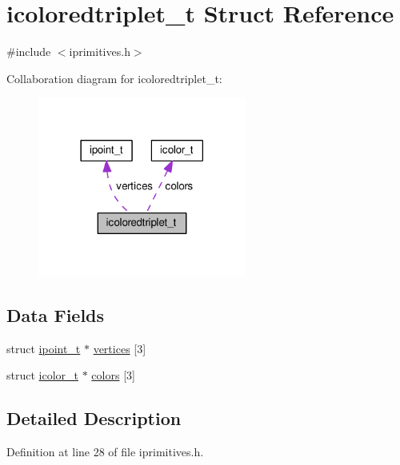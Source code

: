 \hypertarget{structicoloredtriplet__t}{\section{icoloredtriplet\-\_\-t Struct Reference}
\label{structicoloredtriplet__t}
}


{\ttfamily \#include $<$iprimitives.\-h$>$}



Collaboration diagram for icoloredtriplet\-\_\-t\-:\nopagebreak
\begin{figure}[H]
\begin{center}
\leavevmode
\includegraphics[width=194pt]{structicoloredtriplet__t__coll__graph}
\end{center}
\end{figure}
\subsection*{Data Fields}
\begin{DoxyCompactItemize}
\item 
struct \hyperlink{structipoint__t}{ipoint\-\_\-t} $\ast$ \hyperlink{structicoloredtriplet__t_aa599939c78c387bc80a763f3e3728fee}{vertices} \mbox{[}3\mbox{]}
\item 
struct \hyperlink{structicolor__t}{icolor\-\_\-t} $\ast$ \hyperlink{structicoloredtriplet__t_ac0ba48c5e0ba663bd8c0fb7b3ac2a2a9}{colors} \mbox{[}3\mbox{]}
\end{DoxyCompactItemize}


\subsection{Detailed Description}


Definition at line 28 of file iprimitives.\-h.



